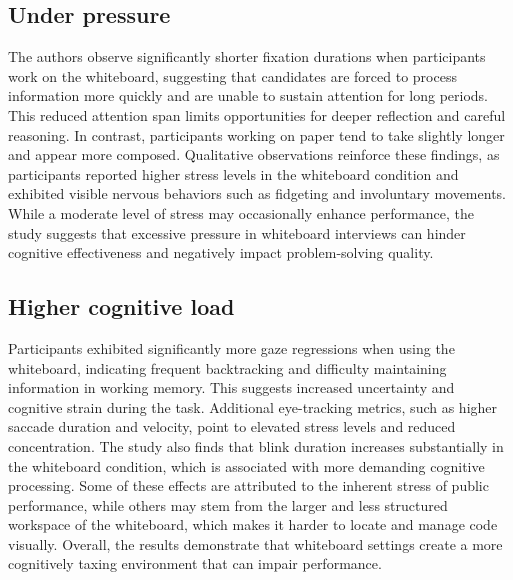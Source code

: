 \subsection{Under pressure}
The authors observe significantly shorter fixation durations when participants work on the whiteboard, suggesting that candidates are forced to process information more quickly and are unable to sustain attention for long periods. This reduced attention span limits opportunities for deeper reflection and careful reasoning. In contrast, participants working on paper tend to take slightly longer and appear more composed. Qualitative observations reinforce these findings, as participants reported higher stress levels in the whiteboard condition and exhibited visible nervous behaviors such as fidgeting and involuntary movements. While a moderate level of stress may occasionally enhance performance, the study suggests that excessive pressure in whiteboard interviews can hinder cognitive effectiveness and negatively impact problem-solving quality.

\subsection{Higher cognitive load}
Participants exhibited significantly more gaze regressions when using the whiteboard, indicating frequent backtracking and difficulty maintaining information in working memory. This suggests increased uncertainty and cognitive strain during the task. Additional eye-tracking metrics, such as higher saccade duration and velocity, point to elevated stress levels and reduced concentration. The study also finds that blink duration increases substantially in the whiteboard condition, which is associated with more demanding cognitive processing. Some of these effects are attributed to the inherent stress of public performance, while others may stem from the larger and less structured workspace of the whiteboard, which makes it harder to locate and manage code visually. Overall, the results demonstrate that whiteboard settings create a more cognitively taxing environment that can impair performance.
